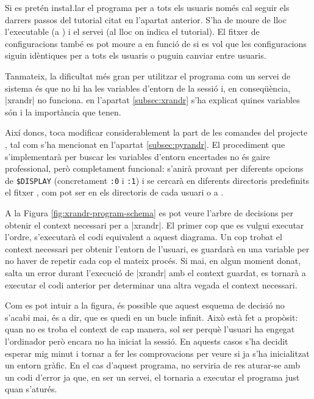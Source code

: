 Si es pretén insta\l.lar el programa per a tots els usuaris només cal seguir
els darrers passos del tutorial citat en l'apartat anterior. S'ha de moure de
lloc l'executable (a ) i el servei (al lloc on indica el
tutorial). El fitxer de configuracions també es pot moure a  en funció
de si es vol que les configuracions siguin idèntiques per a tots els usuaris o
puguin canviar entre usuaris.

Tanmateix, la dificultat més gran per utilitzar el programa com un servei de
sistema és que no hi ha les variables d'entorn de la sessió i, en conseqüència,
\ord|xrandr| no funciona. en l'apartat \ref{subsec:xrandr} s'ha explicat quines
variables són i la importància que tenen.

Així doncs, toca modificar considerablement la part de les comandes del
projecte , tal com s'ha mencionat en l'apartat \ref{subsec:pyrandr}.
El procediment que s'implementarà per buscar les variables d'entorn encertades
no és gaire professional, però completament funcional: s'anirà provant per diferents
opcions de \verb|$DISPLAY| (concretament \verb|:0| i \verb|:1|) i se cercarà
en diferents directoris predefinits el fitxer , com pot ser
en els directoris de cada usuari o a .



A la Figura \ref{fig:xrandr-program-schema} es pot veure l'arbre de decisions
per obtenir el context necessari per a \ord|xrandr|. El primer cop que es
vulgui executar l'ordre, s'executarà el codi equivalent a aquest diagrama.
Un cop trobat el context necessari per obtenir l'entorn de l'usuari, es guardarà
en una variable per no haver de repetir cada cop el mateix procés. Si mai, en algun
moment donat, salta un error durant l'execució de \ord|xrandr| amb el context
guardat, es tornarà a executar el codi anterior per determinar una altra vegada
el context necessari.

Com es pot intuir a la figura, és possible que aquest esquema de decisió no
s'acabi mai, és a dir, que es quedi en un bucle infinit. Això està fet a
propòsit: quan no es troba el context de cap manera, sol ser perquè l'usuari ha
engegat l'ordinador però encara no ha iniciat la sessió. En aquests casos s'ha
decidit esperar mig minut i tornar a fer les comprovacions per veure si ja
s'ha inicialitzat un entorn gràfic. En el cas d'aquest programa, no serviria de
res aturar-se amb un codi d'error ja que, en ser un servei, el 
tornaria a executar el programa just quan s'aturés.

